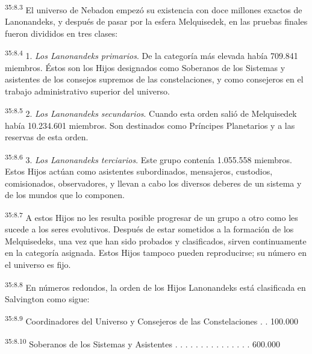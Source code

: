 \par
\textsuperscript{35:8.3} El universo de Nebadon empezó su existencia con doce millones exactos de Lanonandeks, y después de pasar por la esfera Melquisedek, en las pruebas finales fueron divididos en tres clases:

\par
\textsuperscript{35:8.4} 1. \textit{Los Lanonandeks primarios}. De la categoría más elevada había 709.841 miembros. Éstos son los Hijos designados como Soberanos de los Sistemas y asistentes de los consejos supremos de las constelaciones, y como consejeros en el trabajo administrativo superior del universo.

\par
\textsuperscript{35:8.5} 2. \textit{Los Lanonandeks secundarios}. Cuando esta orden salió de Melquisedek había 10.234.601 miembros. Son destinados como Príncipes Planetarios y a las reservas de esta orden.

\par
\textsuperscript{35:8.6} 3. \textit{Los Lanonandeks terciarios}. Este grupo contenía 1.055.558 miembros. Estos Hijos actúan como asistentes subordinados, mensajeros, custodios, comisionados, observadores, y llevan a cabo los diversos deberes de un sistema y de los mundos que lo componen.

\par
\textsuperscript{35:8.7} A estos Hijos no les resulta posible progresar de un grupo a otro como les sucede a los seres evolutivos. Después de estar sometidos a la formación de los Melquisedeks, una vez que han sido probados y clasificados, sirven continuamente en la categoría asignada. Estos Hijos tampoco pueden reproducirse; su número en el universo es fijo.

\par
\textsuperscript{35:8.8} En números redondos, la orden de los Hijos Lanonandeks está clasificada en Salvington como sigue:

\par
\textsuperscript{35:8.9} Coordinadores del Universo y Consejeros de las Constelaciones . . 100.000

\par
\textsuperscript{35:8.10} Soberanos de los Sistemas y Asistentes . . . . . . . . . . . . . . . 600.000


